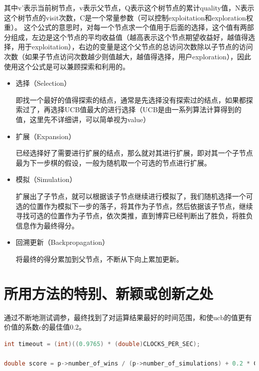 \documentclass{ctexrep}
\begin{document}
其中v'表示当前树节点，v表示父节点，Q表示这个树节点的累计quality值，N表示这个树节点的visit次数，C是一个常量参数（可以控制exploitation和exploration权重）。
这个公式的意思时，对每一个节点求一个值用于后面的选择，这个值有两部分组成，左边是这个节点的平均收益值（越高表示这个节点期望收益好，越值得选择，用于exploitation），右边的变量是这个父节点的总访问次数除以子节点的访问次数（如果子节点访问次数越少则值越大，越值得选择，用户exploration），因此使用这个公式是可以兼顾探索和利用的。
\begin{itemize}

\item 选择（Selection）

即找一个最好的值得探索的结点，通常是先选择没有探索过的结点，如果都探索过了，再选择UCB值最大的进行选择（UCB是由一系列算法计算得到的值，这里先不详细讲，可以简单视为value）

\item 扩展（Expansion）

已经选择好了需要进行扩展的结点，那么就对其进行扩展，即对其一个子节点最为下一步棋的假设，一般为随机取一个可选的节点进行扩展。

\item 模拟（Simulation）

扩展出了子节点，就可以根据该子节点继续进行模拟了，我们随机选择一个可选的位置作为模拟下一步的落子，将其作为子节点，然后依据该子节点，继续寻找可选的位置作为子节点，依次类推，直到博弈已经判断出了胜负，将胜负信息作为最终得分。

\item 回溯更新（Backpropagation）

将最终的得分累加到父节点，不断从下向上累加更新。

\end{itemize}
\thispagestyle{empty}
\section{所用方法的特别、新颖或创新之处}
通过不断地测试调参，最终找到了对运算结果最好的时间范围，和使ucb的值更有价值的系数c的最佳值0.2。

\begin{lstlisting}[language=C++]
int timeout = (int)((0.9765) * (double)CLOCKS_PER_SEC); 

double score = p->number_of_wins / (p->number_of_simulations) + 0.2 * C * sqrt(log(2 * number_of_simulations) / (p->number_of_simulations));

\end{lstlisting}
\end{document}
